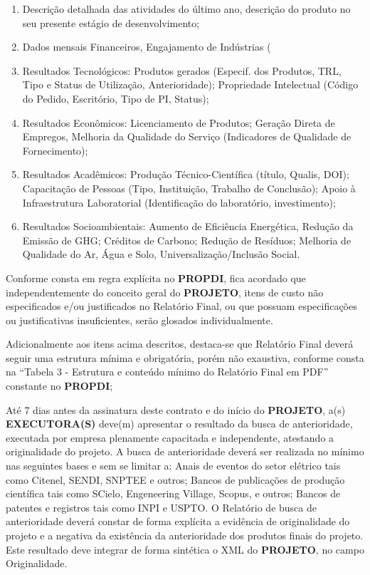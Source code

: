 \begin{enumerate}[label=\alph*), leftmargin=3cm]
    \item Descrição detalhada das atividades do último ano, descrição do produto no seu presente estágio de desenvolvimento;
    \item Dados mensais Financeiros, Engajamento de Indústrias (%
    \item Resultados Tecnológicos: Produtos gerados (Especif. dos Produtos, TRL, Tipo e Status de Utilização, Anterioridade); Propriedade Intelectual (Código do Pedido, Escritório, Tipo de PI, Status);
    \item Resultados Econômicos: Licenciamento de Produtos; Geração Direta de Empregos, Melhoria da Qualidade do Serviço (Indicadores de Qualidade de Fornecimento);
    \item Resultados Acadêmicos: Produção Técnico-Científica (título, Qualis, DOI); Capacitação de Pessoas (Tipo, Instituição, Trabalho de Conclusão); Apoio à Infraestrutura Laboratorial (Identificação do laboratório, investimento);
    \item Resultados Socioambientais: Aumento de Eficiência Energética, Redução da Emissão de GHG; Créditos de Carbono; Redução de Resíduos; Melhoria de Qualidade do Ar, Água e Solo, Universalização/Inclusão Social.

\end{enumerate}

\xx Conforme consta em regra explícita no \textbf{PROPDI}, fica acordado que independentemente do conceito geral do \textbf{PROJETO}, itens de custo não especificados e/ou justificados no Relatório Final, ou que possuam especificações ou justificativas insuficientes, serão glosados individualmente.

\xx Adicionalmente aos itens acima descritos, destaca-se que Relatório Final deverá seguir uma estrutura mínima e obrigatória, porém não exaustiva, conforme consta na “Tabela 3 - Estrutura e conteúdo mínimo do Relatório Final em PDF” constante no \textbf{PROPDI};

\xx Até 7 dias antes da assinatura deste contrato e do início do \textbf{PROJETO}, a(s) \textbf{EXECUTORA(S)} deve(m) apresentar o resultado da busca de anterioridade, executada por empresa plenamente capacitada e independente, atestando a originalidade do projeto. A busca de anterioridade deverá ser realizada no mínimo nas seguintes bases e sem se limitar a: Anais de eventos do setor elétrico tais como Citenel, SENDI, SNPTEE e outros; Bancos de publicações de produção científica tais como SCielo, Engeneering Village, Scopus, e outros; Bancos de patentes e registros tais como INPI e USPTO.  O Relatório de busca de anterioridade deverá constar de forma explícita a evidência de originalidade do projeto e a negativa da existência da anterioridade dos produtos finais do projeto. Este resultado deve integrar de forma sintética o XML do \textbf{PROJETO}, no campo Originalidade.

